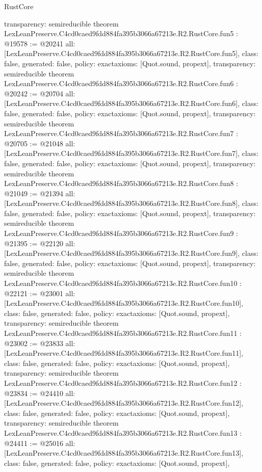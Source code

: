 \begin{lexlean}{RustCore}
\begin{coremodule}
{  transparency: semireducible
}
theorem LexLeanPreserve.C4cd0caed9fdd884fa395b3066a67213e.R2.RustCore.fun5 : @19578 := @20241 {
  all: [LexLeanPreserve.C4cd0caed9fdd884fa395b3066a67213e.R2.RustCore.fun5],
  class: false,
  generated: false,
  policy: exact{axioms: [Quot.sound, propext]},
  transparency: semireducible
}
theorem LexLeanPreserve.C4cd0caed9fdd884fa395b3066a67213e.R2.RustCore.fun6 : @20242 := @20704 {
  all: [LexLeanPreserve.C4cd0caed9fdd884fa395b3066a67213e.R2.RustCore.fun6],
  class: false,
  generated: false,
  policy: exact{axioms: [Quot.sound, propext]},
  transparency: semireducible
}
theorem LexLeanPreserve.C4cd0caed9fdd884fa395b3066a67213e.R2.RustCore.fun7 : @20705 := @21048 {
  all: [LexLeanPreserve.C4cd0caed9fdd884fa395b3066a67213e.R2.RustCore.fun7],
  class: false,
  generated: false,
  policy: exact{axioms: [Quot.sound, propext]},
  transparency: semireducible
}
theorem LexLeanPreserve.C4cd0caed9fdd884fa395b3066a67213e.R2.RustCore.fun8 : @21049 := @21394 {
  all: [LexLeanPreserve.C4cd0caed9fdd884fa395b3066a67213e.R2.RustCore.fun8],
  class: false,
  generated: false,
  policy: exact{axioms: [Quot.sound, propext]},
  transparency: semireducible
}
theorem LexLeanPreserve.C4cd0caed9fdd884fa395b3066a67213e.R2.RustCore.fun9 : @21395 := @22120 {
  all: [LexLeanPreserve.C4cd0caed9fdd884fa395b3066a67213e.R2.RustCore.fun9],
  class: false,
  generated: false,
  policy: exact{axioms: [Quot.sound, propext]},
  transparency: semireducible
}
theorem LexLeanPreserve.C4cd0caed9fdd884fa395b3066a67213e.R2.RustCore.fun10 : @22121 := @23001 {
  all: [LexLeanPreserve.C4cd0caed9fdd884fa395b3066a67213e.R2.RustCore.fun10],
  class: false,
  generated: false,
  policy: exact{axioms: [Quot.sound, propext]},
  transparency: semireducible
}
theorem LexLeanPreserve.C4cd0caed9fdd884fa395b3066a67213e.R2.RustCore.fun11 : @23002 := @23833 {
  all: [LexLeanPreserve.C4cd0caed9fdd884fa395b3066a67213e.R2.RustCore.fun11],
  class: false,
  generated: false,
  policy: exact{axioms: [Quot.sound, propext]},
  transparency: semireducible
}
theorem LexLeanPreserve.C4cd0caed9fdd884fa395b3066a67213e.R2.RustCore.fun12 : @23834 := @24410 {
  all: [LexLeanPreserve.C4cd0caed9fdd884fa395b3066a67213e.R2.RustCore.fun12],
  class: false,
  generated: false,
  policy: exact{axioms: [Quot.sound, propext]},
  transparency: semireducible
}
theorem LexLeanPreserve.C4cd0caed9fdd884fa395b3066a67213e.R2.RustCore.fun13 : @24411 := @25016 {
  all: [LexLeanPreserve.C4cd0caed9fdd884fa395b3066a67213e.R2.RustCore.fun13],
  class: false,
  generated: false,
  policy: exact{axioms: [Quot.sound, propext]},
}
\end{coremodule}
\end{lexlean}
